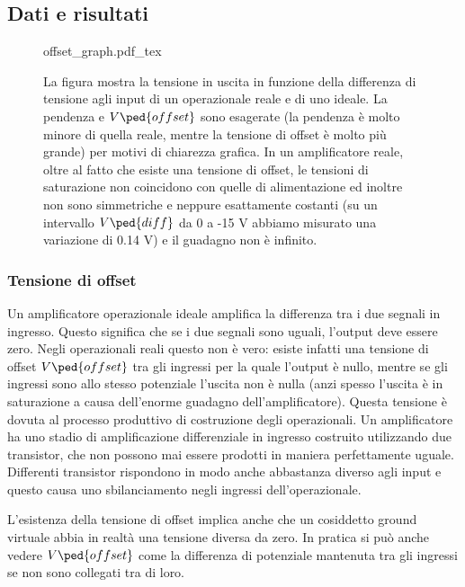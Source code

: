 \subsection{Dati e risultati}

\begin{figure}[t!]
    \def\svgwidth{0.5\textwidth}
    {offset_graph.pdf_tex}
    \caption{La figura mostra la tensione in uscita in funzione della differenza di tensione agli input di 
        un operazionale reale e di uno ideale. La pendenza e $V\ped{offset}$ sono esagerate
        (la pendenza è molto minore di quella reale, mentre la tensione di offset è molto più grande) per
        motivi di chiarezza grafica. In un amplificatore reale, oltre
        al fatto che esiste una tensione di offset, le tensioni di saturazione non coincidono con quelle
        di alimentazione ed inoltre non sono simmetriche e neppure esattamente costanti (su un intervallo
        $V\ped{diff}$ da 0 a -15 V abbiamo misurato una variazione di 0.14 V) e il guadagno non è infinito. }
    \label{fig:v_offset_graph2}
\end{figure}

\subsubsection{Tensione di offset}

Un amplificatore operazionale ideale amplifica la differenza tra i due segnali
in ingresso. Questo significa che se i due segnali sono uguali, l'output deve essere zero.
Negli operazionali reali questo non è vero: esiste infatti una tensione di offset
$V\ped{offset}$ tra gli ingressi per la quale l'output è nullo, mentre se
gli ingressi sono allo stesso potenziale l'uscita non è nulla (anzi spesso l'uscita è
in saturazione a causa dell'enorme guadagno dell'amplificatore).
Questa tensione è dovuta al processo produttivo di costruzione degli operazionali.
Un amplificatore ha uno stadio di amplificazione differenziale in ingresso costruito utilizzando due
transistor, che non possono mai essere prodotti in maniera perfettamente uguale. Differenti
transistor rispondono in modo anche abbastanza diverso agli input e questo causa uno sbilanciamento
negli ingressi dell'operazionale.

L'esistenza della tensione di offset implica anche che un cosiddetto ground virtuale
abbia in realtà una tensione diversa da zero. In pratica si può anche vedere $V\ped{offset}$
come la differenza di potenziale mantenuta tra gli ingressi se non sono collegati tra di loro.

